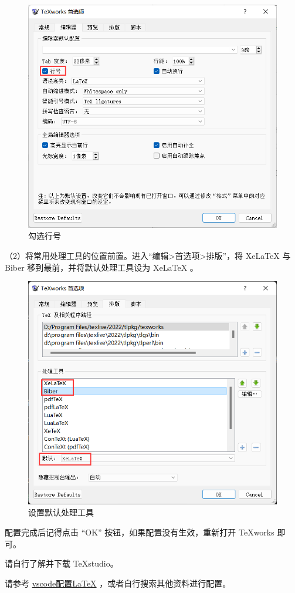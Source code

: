\begin{figure}[H]  %
  \centering  %
  \includegraphics[scale=.45]{figure/thesis/texworkln.png}  %
  \caption{勾选行号}  %
  \label{fig:tools:texworkln}  %
\end{figure}

（2）将常用处理工具的位置前置。进入“编辑>首选项>排版”，将 XeLaTeX 与 Biber 移到最前，并将默认处理工具设为 XeLaTeX 。

\begin{figure}[H]  %
  \centering  %
  \includegraphics[scale=.45]{figure/thesis/texworkpt.png}  %
  \caption{设置默认处理工具}  %
  \label{fig:tools:texworkpt}  %
\end{figure}

配置完成后记得点击 “OK” 按钮，如果配置没有生效，重新打开 \TeX{works} 即可。


请自行了解并下载 \TeX{studio}。

请参考 \href{https://zhuanlan.zhihu.com/p/166523064}{vscode配置LaTeX} ，或者自行搜索其他资料进行配置。

